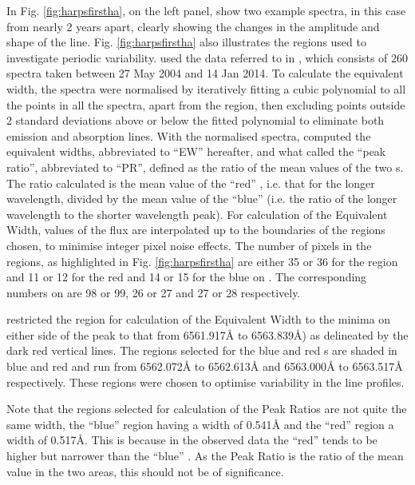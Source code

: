 In Fig. \ref{fig:harpsfirstha}, on the left panel, {\Firstp} show two example spectra, in this case from {\harps} nearly
2 years apart, clearly showing the changes in the amplitude and shape of the {\ha} line. Fig. \ref{fig:harpsfirstha}
also illustrates the regions used to investigate periodic variability. {\FirstP} used the {\harps} data referred to in
\citet[Table 3]{suarezmascareno15}, which consists of 260 spectra taken between 27 May 2004 and 14 Jan 2014.
To calculate the equivalent width, the spectra were normalised by iteratively fitting a cubic polynomial to all the
points in all the spectra, apart from the {\ha} region, then excluding points outside 2 standard deviations above or
below the fitted polynomial to eliminate both emission and absorption lines. With the normalised spectra, {\Firstp}
computed the equivalent widths, abbreviated to ``EW'' hereafter, and what {\Firstp} called the ``peak ratio'',
abbreviated to ``PR'', defined as the ratio of the mean values of the two \horn s. The ratio calculated is the mean
value of the ``red'' \horn, i.e. that for the longer wavelength, divided by the mean value of the ``blue'' {\horn}
(i.e. the ratio of the longer wavelength to the shorter wavelength peak). For calculation of the Equivalent Width,
values of the flux are interpolated up to the boundaries of the regions chosen, to minimise integer pixel noise
effects. The number of pixels in the regions, as highlighted in Fig. \ref{fig:harpsfirstha} are either 35 or 36 for the
{\ha} region and 11 or 12 for the red {\horn} and 14 or 15 for the blue {\horn} on {\uves}. The corresponding numbers on
{\harps} are 98 or 99, 26 or 27 and 27 or 28 respectively.

{\FirstP} restricted the {\ha} region for calculation of the Equivalent Width to the minima on either side of the peak
to that from 6561.917{\AA} to 6563.839\AA) as delineated by the dark red vertical lines. The regions selected for the
blue and red \horn s are shaded in blue and red and run from 6562.072{\AA} to 6562.613{\AA} and 6563.000{\AA} to
6563.517{\AA} respectively. These regions were chosen to optimise variability in the line profiles.

Note that the regions selected for calculation of the Peak Ratios are not quite the same width, the ``blue'' \horn{}
region having a width of 0.541{\AA} and the ``red'' {\horn} region a width of 0.517\AA. This is because in the observed
data the ``red'' {\horn} tends to be higher but narrower than the ``blue'' \horn. As the Peak Ratio is the ratio of the
mean value in the two areas, this should not be of significance.


